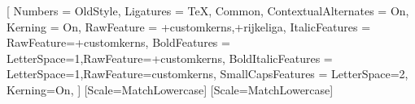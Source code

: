 \setmainfont{Comic Neue}[
  Numbers = OldStyle,
  Ligatures = {TeX, Common},
  ContextualAlternates = On,
  Kerning = On,
  RawFeature = {+customkerns,+rijkeliga},
  ItalicFeatures = {RawFeature={+customkerns}},
  BoldFeatures = {LetterSpace=1,RawFeature={+customkerns}},
  BoldItalicFeatures = {LetterSpace=1,RawFeature={customkerns}},
  SmallCapsFeatures = {LetterSpace=2, Kerning=On},
]
\setsansfont{Comic Neue}[Scale=MatchLowercase]
\setmonofont{Inconsolatazi4}[Scale=MatchLowercase]
\linespread{1.10}

\newcommand{\VersionFontName}{Comic Neue (Euler)}






